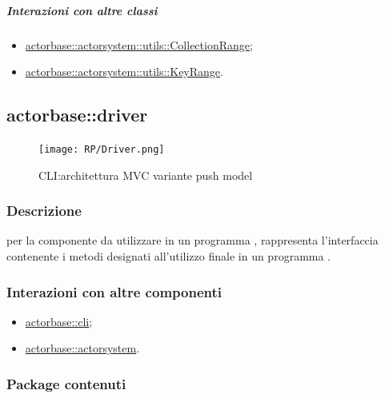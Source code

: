 \documentclass{scalatekids-article}
\begin{document}
\subparagraph{Interazioni con altre classi}
\begin{itemize}
\item \hyperref[sec:actorbase::actorsystem::utils::CollectionRange]{actorbase::actorsystem::utils::CollectionRange};
\item \hyperref[sec:actorbase::actorsystem::utils::KeyRange]{actorbase::actorsystem::utils::KeyRange}.
\end{itemize}


\subsection{actorbase::driver}
\label{sec:actorbase::driver}

\begin{figure}[H]
  \begin{center}
    \texttt{[image: RP/Driver.png]}
    \caption{CLI:architettura MVC variante push model}
  \end{center}
\end{figure}

\subsubsection{Descrizione}

 per la componente  da utilizzare in un programma
, rappresenta l'interfaccia contenente i metodi designati
all'utilizzo finale in un programma .

\subsubsection{Interazioni con altre componenti}

\begin{itemize}
\item \hyperref[sec:actorbase::cli]{actorbase::cli};
\item \hyperref[sec:actorbase::actorsystem]{actorbase::actorsystem}.
\end{itemize}

\subsubsection{Package contenuti}
\end{document}
